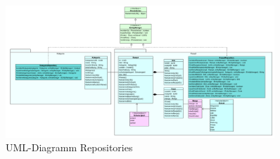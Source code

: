 \begin{figure}[ht]
	\centering
	\includegraphics[width=0.90\textwidth]{Bilder/Reposetory-UML.png} 
	\caption{UML-Diagramm Repositories}
	\label{fig:RepositoriesUML}
\end{figure}
